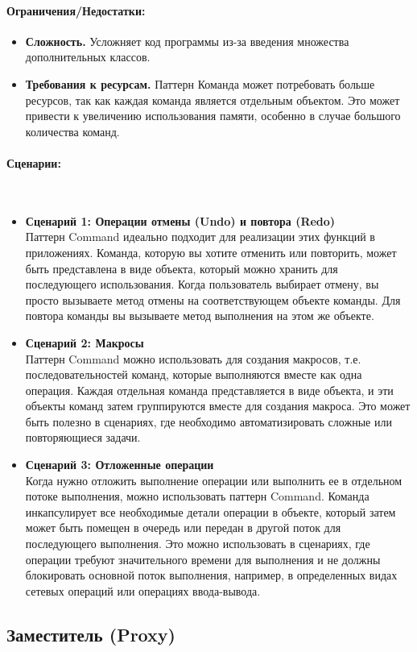 \documentclass[12pt,onecolumn]{article}
\newcommand{\nparagraph}[1]{\paragraph{#1}\mbox{}\\}
\begin{document}
\paragraph{Ограничения/Недостатки:}
\begin{itemize}
  \item \textbf{Сложность.} Усложняет код программы из-за введения множества дополнительных классов.
  \item \textbf{Требования к ресурсам.} Паттерн Команда может потребовать больше ресурсов, так как каждая команда является отдельным объектом. Это может привести к увеличению использования памяти, особенно в случае большого количества команд.
\end{itemize}
\nparagraph{Сценарии:}
\begin{itemize}
  \item {
    \textbf{Сценарий 1: Операции отмены (Undo) и повтора (Redo)}\\
    Паттерн Command идеально подходит для реализации этих функций в приложениях. Команда, которую вы хотите отменить или повторить, может быть представлена в виде объекта, который можно хранить для последующего использования. Когда пользователь выбирает отмену, вы просто вызываете метод отмены на соответствующем объекте команды. Для повтора команды вы вызываете метод выполнения на этом же объекте.
  }
  \item  {
    \textbf{Сценарий 2: Макросы}\\
    Паттерн Command можно использовать для создания макросов, т.е. последовательностей команд, которые выполняются вместе как одна операция. Каждая отдельная команда представляется в виде объекта, и эти объекты команд затем группируются вместе для создания макроса. Это может быть полезно в сценариях, где необходимо автоматизировать сложные или повторяющиеся задачи.
  }
  \item  {
    \textbf{Сценарий 3: Отложенные операции}\\
    Когда нужно отложить выполнение операции или выполнить ее в отдельном потоке выполнения, можно использовать паттерн Command. Команда инкапсулирует все необходимые детали операции в объекте, который затем может быть помещен в очередь или передан в другой поток для последующего выполнения. Это можно использовать в сценариях, где операции требуют значительного времени для выполнения и не должны блокировать основной поток выполнения, например, в определенных видах сетевых операций или операциях ввода-вывода.
  }
\end{itemize}
\subsection{Заместитель (Proxy)}
\end{document}

